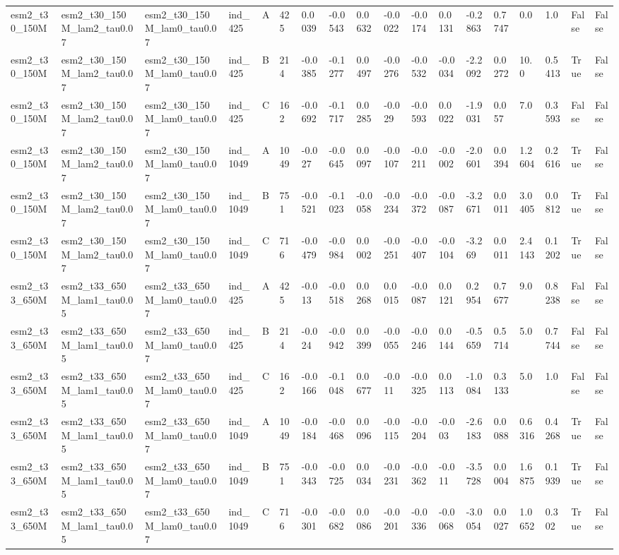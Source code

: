 \begin{table}[ht]
\begin{tabular}{llllllllllllllllll}
esm2\_t30\_150M & esm2\_t30\_150M\_lam2\_tau0.07 & esm2\_t30\_150M\_lam0\_tau0.07 & ind\_425 & A & 425 & 0.0039 & -0.0543 & 0.0632 & -0.0022 & -0.0174 & 0.0131 & -0.2863 & 0.7747 & 0.0 & 1.0 & False & False \\
esm2\_t30\_150M & esm2\_t30\_150M\_lam2\_tau0.07 & esm2\_t30\_150M\_lam0\_tau0.07 & ind\_425 & B & 214 & -0.0385 & -0.1277 & 0.0497 & -0.0276 & -0.0532 & -0.0034 & -2.2092 & 0.0272 & 10.0 & 0.5413 & True & False \\
esm2\_t30\_150M & esm2\_t30\_150M\_lam2\_tau0.07 & esm2\_t30\_150M\_lam0\_tau0.07 & ind\_425 & C & 162 & -0.0692 & -0.1717 & 0.0285 & -0.029 & -0.0593 & 0.0022 & -1.9031 & 0.057 & 7.0 & 0.3593 & False & False \\
esm2\_t30\_150M & esm2\_t30\_150M\_lam2\_tau0.07 & esm2\_t30\_150M\_lam0\_tau0.07 & ind\_1049 & A & 1049 & -0.027 & -0.0645 & 0.0097 & -0.0107 & -0.0211 & -0.0002 & -2.0601 & 0.0394 & 1.2604 & 0.2616 & True & False \\
esm2\_t30\_150M & esm2\_t30\_150M\_lam2\_tau0.07 & esm2\_t30\_150M\_lam0\_tau0.07 & ind\_1049 & B & 751 & -0.0521 & -0.1023 & -0.0058 & -0.0234 & -0.0372 & -0.0087 & -3.2671 & 0.0011 & 3.0405 & 0.0812 & True & False \\
esm2\_t30\_150M & esm2\_t30\_150M\_lam2\_tau0.07 & esm2\_t30\_150M\_lam0\_tau0.07 & ind\_1049 & C & 716 & -0.0479 & -0.0984 & 0.0002 & -0.0251 & -0.0407 & -0.0104 & -3.269 & 0.0011 & 2.4143 & 0.1202 & True & False \\
esm2\_t33\_650M & esm2\_t33\_650M\_lam1\_tau0.05 & esm2\_t33\_650M\_lam0\_tau0.07 & ind\_425 & A & 425 & -0.013 & -0.0518 & 0.0268 & 0.0015 & -0.0087 & 0.0121 & 0.2954 & 0.7677 & 9.0 & 0.8238 & False & False \\
esm2\_t33\_650M & esm2\_t33\_650M\_lam1\_tau0.05 & esm2\_t33\_650M\_lam0\_tau0.07 & ind\_425 & B & 214 & -0.024 & -0.0942 & 0.0399 & -0.0055 & -0.0246 & 0.0144 & -0.5659 & 0.5714 & 5.0 & 0.7744 & False & False \\
esm2\_t33\_650M & esm2\_t33\_650M\_lam1\_tau0.05 & esm2\_t33\_650M\_lam0\_tau0.07 & ind\_425 & C & 162 & -0.0166 & -0.1048 & 0.0677 & -0.011 & -0.0325 & 0.0113 & -1.0084 & 0.3133 & 5.0 & 1.0 & False & False \\
esm2\_t33\_650M & esm2\_t33\_650M\_lam1\_tau0.05 & esm2\_t33\_650M\_lam0\_tau0.07 & ind\_1049 & A & 1049 & -0.0184 & -0.0468 & 0.0096 & -0.0115 & -0.0204 & -0.003 & -2.6183 & 0.0088 & 0.6316 & 0.4268 & True & False \\
esm2\_t33\_650M & esm2\_t33\_650M\_lam1\_tau0.05 & esm2\_t33\_650M\_lam0\_tau0.07 & ind\_1049 & B & 751 & -0.0343 & -0.0725 & 0.0034 & -0.0231 & -0.0362 & -0.011 & -3.5728 & 0.0004 & 1.6875 & 0.1939 & True & False \\
esm2\_t33\_650M & esm2\_t33\_650M\_lam1\_tau0.05 & esm2\_t33\_650M\_lam0\_tau0.07 & ind\_1049 & C & 716 & -0.0301 & -0.0682 & 0.0086 & -0.0201 & -0.0336 & -0.0068 & -3.0054 & 0.0027 & 1.0652 & 0.302 & True & False \\
\hline
\end{tabular}
\end{table}
